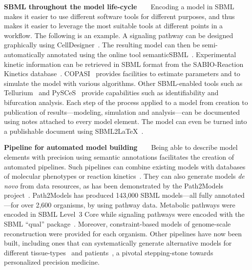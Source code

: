\documentclass[]{draft-sbml-paper}
\begin{document}
\textbf{SBML throughout the model life-cycle}~~~~Encoding a model in SBML makes it easier to use different software tools for different purposes, and thus makes it easier to leverage the most suitable tools at different points in a workflow.  The following is an example.  A signaling pathway can be designed graphically using CellDesigner~\citep{funahashi2008celldesigner}. The resulting model can then be semi-automatically annotated using the online tool semanticSBML~\citep{krause2010annotation}. Experimental kinetic information can be retrieved in SBML format from the SABIO-Reaction Kinetics database~\citep{wittig2017sabio}. COPASI~\citep{hoops2006copasi} provides facilities to estimate parameters and to simulate the model with various algorithms. Other SBML-enabled tools such as Tellurium~\citep{choi2016tellurium} and PySCeS~\citep{olivier2005modelling} provide capabilities such as identifiability and bifurcation analysis. Each step of the process applied to a model from creation to publication of results---modeling, simulation and analysis---can be documented using notes attached to every model element. The model can even be turned into a publishable document using SBML2\LaTeX~\citep{Draeger2009b}.

\textbf{Pipeline for automated model building}~~~~Being able to describe model elements with precision using semantic annotations facilitates the creation of automated pipelines. Such pipelines can combine existing models with databases of molecular phenotypes or reaction kinetics~\citep{li2010systematic}.  They can also generate models \emph{de novo} from data resources, as has been demonstrated by the Path2Models project~\citep{buchel2013path2models}. Path2Models has produced 143,000 SBML models---all fully annotated---for over 2,600 organisms, by using pathway data. Metabolic pathways were encoded in SBML Level~3 Core while signaling pathways were encoded with the SBML ``qual'' package~\citep{chaouiya2013sbml}. Moreover, constraint-based models of genome-scale reconstruction were provided for each organism. Other pipelines have now been built, including ones that can systematically generate alternative models for different tissue-types~\citep{wang2012reconstruction,thiele2013community} and patients~\citep{uhlen2017pathology}, a pivotal stepping-stone towards personalized precision medicine.
\end{document}
